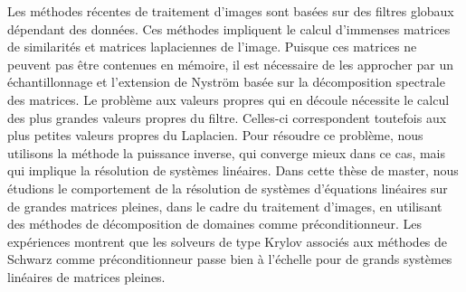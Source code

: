 Les méthodes récentes de traitement d'images sont basées sur des filtres globaux dépendant des données.
Ces méthodes impliquent le calcul d'immenses matrices de similarités et matrices laplaciennes de l'image.
Puisque ces matrices ne peuvent pas être contenues en mémoire, il est nécessaire de les approcher par un échantillonnage et l'extension de Nystr\"om basée sur la décomposition spectrale des matrices.
Le problème aux valeurs propres qui en découle nécessite le calcul des plus grandes valeurs propres du filtre.
Celles-ci correspondent toutefois aux plus petites valeurs propres du Laplacien.
Pour résoudre ce problème, nous utilisons la méthode la puissance inverse, qui converge mieux dans ce cas, mais qui implique la résolution de systèmes linéaires.
Dans cette thèse de master, nous étudions le comportement de la résolution de systèmes d'équations linéaires sur de grandes matrices pleines, dans le cadre du traitement d'images, en utilisant des méthodes de décomposition de domaines comme préconditionneur.
Les expériences montrent que les solveurs de type Krylov associés aux méthodes de Schwarz comme préconditionneur passe bien à l'échelle pour de grands systèmes linéaires de matrices pleines.
